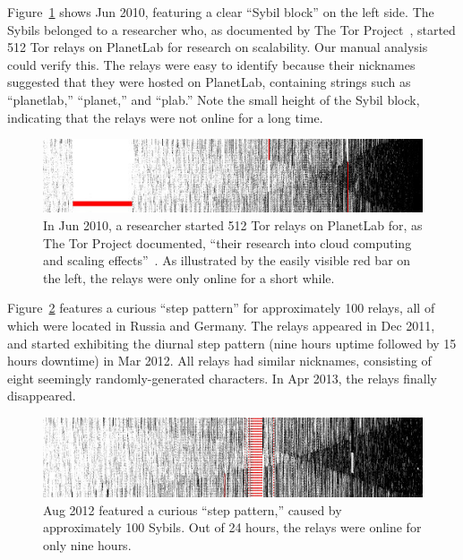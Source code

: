 Figure~\ref{fig:2010-06-planetlab} shows Jun 2010, featuring a clear ``Sybil
block'' on the left side.  The Sybils belonged to a researcher who, as
documented by The Tor Project~\cite{progressreport}, started 512 Tor relays on
PlanetLab for research on scalability.  Our manual analysis could verify this.
The relays were easy to identify because their nicknames suggested that they
were hosted on PlanetLab, containing strings such as ``planetlab,'' ``planet,''
and ``plab.''  Note the small height of the Sybil block, indicating that the
relays were not online for a long time.

\begin{figure}[t]
	\centering
	\includegraphics[width=\linewidth]{diagrams/planetlab-uptimes.jpg}
	\caption{In Jun 2010, a researcher started 512 Tor relays on PlanetLab for,
		as The Tor Project documented, ``their research into cloud computing and
		scaling effects''~\cite{progressreport}.  As illustrated by the easily
		visible red bar on the left, the relays were only online for a short
		while.}
	\label{fig:2010-06-planetlab}
\end{figure}

Figure~\ref{fig:2012-08-steppattern} features a curious ``step pattern'' for
approximately 100 relays, all of which were located in Russia and Germany.  The
relays appeared in Dec 2011, and started exhibiting the diurnal step
pattern (nine hours uptime followed by 15 hours downtime) in Mar 2012.  All
relays had similar nicknames, consisting of eight seemingly randomly-generated
characters.  In Apr 2013, the relays finally disappeared.

\begin{figure}[t]
	\centering
	\includegraphics[width=\linewidth]{diagrams/2012-08.jpg}
	\caption{Aug 2012 featured a curious ``step pattern,'' caused by
	approximately 100 Sybils.  Out of 24 hours, the relays were online for only
	nine hours.}
	\label{fig:2012-08-steppattern}
\end{figure}

